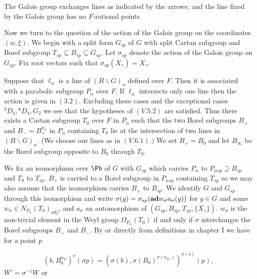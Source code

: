 \documentclass{memo-l}
\theoremstyle{definition}
\theoremstyle{remark}
\numberwithin{section}{chapter}
\numberwithin{equation}{chapter}
\begin{document}
\medskip
\medskip

\noindent
The Galois group exchanges lines as indicated by the arrows; and the line
fixed by the Galois group has no $F$-rational points.

\medskip

   Now we turn to the question of the action of the Galois group on the
coordinates $(w,{\xi})$.  We begin with a split form $G_{sp}$ of $G$ with
split Cartan subgroup and Borel subgroup $T_{sp} {\subseteq} B_{sp}
{\subseteq} G_{sp}$.  Let ${\sigma}_{sp}$ denote the action of the Galois
group on $G_{sp}$.  Fix root vectors such that ${\sigma}_{sp}(X_{{\gamma}})
 =  X_{{\gamma}}$.

   Suppose that ${\ell}_{{\alpha}}$ is a line of $(B\backslash G)_{u}$
defined over $F$.  Then it is associated with a parabolic subgroup
$P_{{\alpha}}$ over $F$.  If ${\ell}_{{\alpha}}$ intersects only one line
then the action is given in $(3.2)$.  Excluding these cases and the
exceptional cases ${}^{3}D_{4}, {}^{6}D_{4}, G_{2}$ we see that the hypotheses
of $(V.5.2)$ are satisfied.  Thus there exists a Cartan subgroup $T_{0}$
over $F$ in $P_{{\alpha}}$ such that the two Borel subgroups $B_{+}$ and
$B_{-}  =  B_{+}^{{\sigma}_{{\alpha}}}$ in $P_{{\alpha}}$ containing
$T_{0}$ lie at the intersection of two lines in $(B\backslash G)_{u}$.  (We
choose our lines as in $(V.6.1).)$ We set $B_{+}  =  B_{0}$ and let
$B_{\infty}$ be the Borel subgroup opposite to $B_{0}$ through $T_{0}$.

   We fix an isomorphism over $\Fb$ of $G$ with $G_{sp}$ which carries
$P_{{\alpha}}$ to $P_{{\alpha}sp} {\supseteq} B_{sp}$ and $T_{0}$ to $T_{sp}$.
$B_{+}$ is carried to a Borel subgroup in $P_{{\alpha}sp}$ containing
$T_{sp}$ so we may also assume that the isomorphism carries $B_{+}$ to
$B_{sp}$.  We identify $G$ and $G_{sp}$ through this isomorphism and write
${\sigma}(g)  =  {\sigma}_{sp}({\bold {ad}}w_{{\sigma}}a_{{\sigma}}(g))$ for $g
 \in  G$ and some $w_{{\sigma}}  \in  N_{P_{{\alpha}}} (T_{0})_{adj}$, and
$a_{{\sigma}}$ an automorphism of
$(G_{sp},B_{sp},T_{sp},\{X_{{\gamma}}\})$.  $w_{{\sigma}}$ is the
non-trivial element in the Weyl group ${\Omega}_{P_{{\alpha}}}
(T_{0})$ if and only if ${\sigma}$ interchanges the Borel subgroups $B_{+}$
and $B_{-}$.  By \cite{MR701566} or directly from definitions in chapter I we have
for a point $p$


$$(b,B_{0}^{n_{w}})^{{\nu}} ({\sigma}p)  =
({\sigma}(b),{\sigma}(B_{0})^{{\sigma}(n_{w'})})^{{\sigma}({\nu})} (p),$$
$W' = {\sigma}^{-1}W$ or
\end{document}

